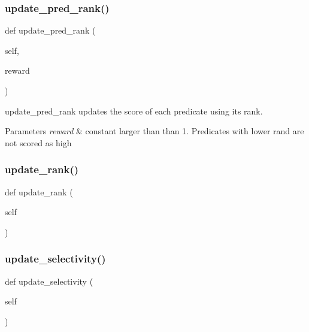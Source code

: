 \subsubsection{\texorpdfstring{update\+\_\+pred\+\_\+rank()}{update\_pred\_rank()}}
{\footnotesize\ttfamily def update\+\_\+pred\+\_\+rank (\begin{DoxyParamCaption}\item[{}]{self,  }\item[{}]{reward }\end{DoxyParamCaption})}



update\+\_\+pred\+\_\+rank updates the score of each predicate using its rank. 


\begin{DoxyParams}{Parameters}
{\em reward} & constant larger than than 1. Predicates with lower rand are not scored as high \\
\hline
\end{DoxyParams}
\mbox{\label{classdynamicfilterapp_1_1models_1_1_predicate_ab9e5706b198fa9e44ba1560ac6ed6687}} 
\subsubsection{\texorpdfstring{update\+\_\+rank()}{update\_rank()}}
{\footnotesize\ttfamily def update\+\_\+rank (\begin{DoxyParamCaption}\item[{}]{self }\end{DoxyParamCaption})}

\mbox{\label{classdynamicfilterapp_1_1models_1_1_predicate_a20d11566ab0f56ccf8baac7a18809185}} 
\subsubsection{\texorpdfstring{update\+\_\+selectivity()}{update\_selectivity()}}
{\footnotesize\ttfamily def update\+\_\+selectivity (\begin{DoxyParamCaption}\item[{}]{self }\end{DoxyParamCaption})}



